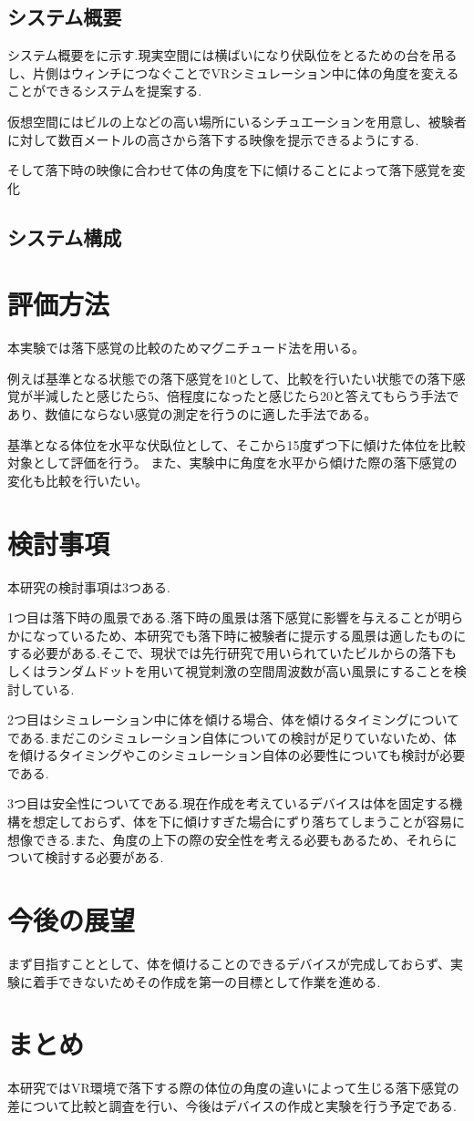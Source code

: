 \documentclass[uplatex]{jsarticle}
\begin{document}
\subsection{システム概要}
システム概要をに示す.現実空間には横ばいになり伏臥位をとるための台を吊るし、片側はウィンチにつなぐことでVRシミュレーション中に体の角度を変えることができるシステムを提案する.

仮想空間にはビルの上などの高い場所にいるシチュエーションを用意し、被験者に対して数百メートルの高さから落下する映像を提示できるようにする.

そして落下時の映像に合わせて体の角度を下に傾けることによって落下感覚を変化



\subsection{システム構成}


\section{評価方法}
本実験では落下感覚の比較のためマグニチュード法を用いる。

例えば基準となる状態での落下感覚を10として、比較を行いたい状態での落下感覚が半減したと感じたら5、倍程度になったと感じたら20と答えてもらう手法であり、数値にならない感覚の測定を行うのに適した手法である。

基準となる体位を水平な伏臥位として、そこから15度ずつ下に傾けた体位を比較対象として評価を行う。
また、実験中に角度を水平から傾けた際の落下感覚の変化も比較を行いたい。

\section{検討事項}
本研究の検討事項は3つある.

1つ目は落下時の風景である.落下時の風景は落下感覚に影響を与えることが明らかになっているため、本研究でも落下時に被験者に提示する風景は適したものにする必要がある.そこで、現状では先行研究で用いられていたビルからの落下もしくはランダムドットを用いて視覚刺激の空間周波数が高い風景にすることを検討している.

2つ目はシミュレーション中に体を傾ける場合、体を傾けるタイミングについてである.まだこのシミュレーション自体についての検討が足りていないため、体を傾けるタイミングやこのシミュレーション自体の必要性についても検討が必要である.

3つ目は安全性についてである.現在作成を考えているデバイスは体を固定する機構を想定しておらず、体を下に傾けすぎた場合にずり落ちてしまうことが容易に想像できる.また、角度の上下の際の安全性を考える必要もあるため、それらについて検討する必要がある.

\section{今後の展望}
まず目指すこととして、体を傾けることのできるデバイスが完成しておらず、実験に着手できないためその作成を第一の目標として作業を進める.

\section{まとめ}
本研究ではVR環境で落下する際の体位の角度の違いによって生じる落下感覚の差について比較と調査を行い、今後はデバイスの作成と実験を行う予定である.


 
\end{document}
